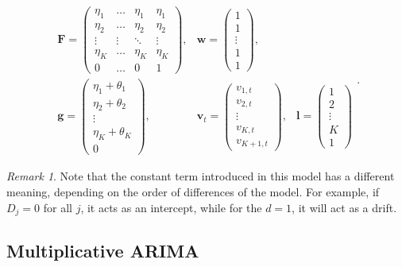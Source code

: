 \documentclass[
]{book}
\theoremstyle{definition}
\theoremstyle{definition}
\theoremstyle{definition}
\theoremstyle{definition}
\theoremstyle{remark}
\newtheorem*{remark}{Remark}
\begin{document}
\begin{equation}
  \begin{aligned}
    \mathbf{F} = \begin{pmatrix} \eta_1 & \dots & \eta_1 & \eta_1 \\ \eta_2 & \dots & \eta_2 & \eta_2 \\ \vdots & \vdots & \ddots & \vdots \\ \eta_K & \dots & \eta_K & \eta_K \\ 0 & \dots & 0 & 1 \end{pmatrix}, & \mathbf{w} = \begin{pmatrix} 1 \\ 1 \\ \vdots \\ 1 \\ 1 \end{pmatrix}, \\
    \mathbf{g} = \begin{pmatrix} \eta_1 + \theta_1 \\ \eta_2 + \theta_2 \\ \vdots \\ \eta_K + \theta_K \\ 0 \end{pmatrix}, & \mathbf{v}_{t} = \begin{pmatrix} v_{1,t} \\ v_{2,t} \\ \vdots \\ v_{K,t} \\ v_{K+1,t} \end{pmatrix}, & \mathbf{l} = \begin{pmatrix} 1 \\ 2 \\ \vdots \\ K \\ 1 \end{pmatrix}
  \end{aligned}.
  \label{eq:ADAMARIMAMatricesConstant}
\end{equation}

\begin{remark}
Note that the constant term introduced in this model has a different meaning, depending on the order of differences of the model. For example, if \(D_j=0\) for all \(j\), it acts as an intercept, while for the \(d=1\), it will act as a drift.
\end{remark}

\hypertarget{ADAMARIMAPureMultiplicative}{%
\subsection{Multiplicative ARIMA}\label{ADAMARIMAPureMultiplicative}}
\end{document}
